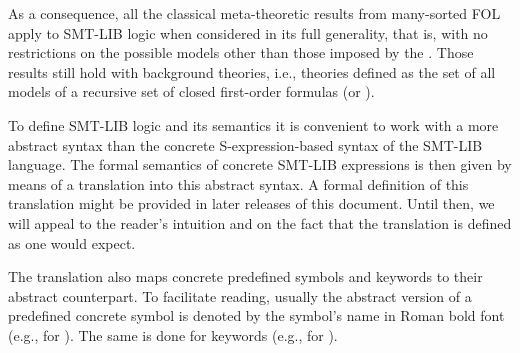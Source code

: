 As a consequence, all the classical meta-theoretic results from many-sorted 
FOL apply to SMT-LIB logic when considered in its full generality, that is,
with no restrictions on the possible models other than those imposed 
by the  .
Those results still hold with  
background theories, i.e., theories defined as the set of all models
of a recursive set of closed first-order formulas (or ).
\medskip

To define SMT-LIB logic and its semantics it is convenient to work 
with a more abstract syntax than the concrete S-expression-based syntax 
of the SMT-LIB language.
The formal semantics of concrete SMT-LIB expressions is then given by means 
of a translation into this abstract syntax.
A formal definition of this translation might be provided in later releases 
of this document.
Until then, we will appeal to the reader's intuition and on the fact that 
the translation is defined as one would expect.

The translation also maps concrete predefined symbols and keywords
to their abstract counterpart.
To facilitate reading, usually the abstract version of 
a predefined concrete symbol is denoted by the symbol's name 
in Roman bold font (e.g.,  for ).
The same is done for keywords (e.g.,  for ).

